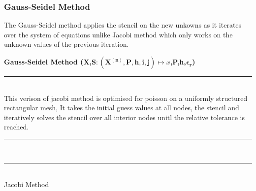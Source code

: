 \subsubsection{Gauss-Seidel Method}
The Gauss-Seidel method applies the stencil on the new unkowns as it iterates over the system of equations unlike Jacobi method which only works on the unknown values of the previous iteration.\\[2mm]
\begin{algorithm}[H]
    \textbf{\large Gauss-Seidel Method (X,$\mathbf{S:(X^{(n)},P,h,i,j)} \mapsto x$,P,h,$\mathbf{\epsilon_r}$)}\\[-1pt]
    \par\noindent\rule{\textwidth}{0.4pt} \\
    This verison of jacobi method is optimised for poisson on a uniformly structured rectangular mesh, It takes the initial guess values at all nodes, the stencil and iteratively solves the stencil over all interior nodes unitl the relative tolerance is reached.  \\[2mm]
    \par\noindent\rule{\textwidth}{0.4pt} \\
    \par\noindent\rule{\textwidth}{0.4pt} \\[2mm]
    \caption{Jacobi Method}
\end{algorithm}
